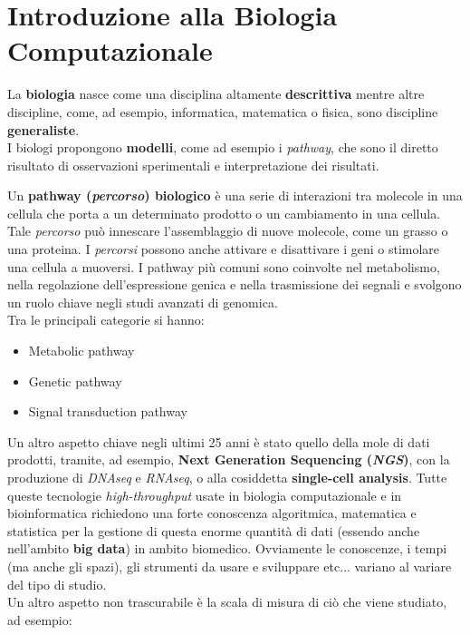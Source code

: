 \documentclass[a4paper,12pt, oneside]{book}
\begin{document}
\chapter{Introduzione alla Biologia Computazionale}
La \textbf{biologia} nasce come una disciplina altamente \textbf{descrittiva}
mentre altre discipline, come, ad esempio, informatica, matematica o fisica,
sono discipline \textbf{generaliste}.\\
I biologi propongono \textbf{modelli}, come ad esempio i \textit{pathway}, che
sono il diretto risultato di osservazioni sperimentali e interpretazione dei
risultati.
\begin{definizione}
  Un \textbf{pathway (\emph{percorso}) biologico} è una serie di interazioni
  tra molecole in una cellula che porta a un determinato prodotto o un
  cambiamento in una cellula. Tale \emph{percorso} può innescare
  l'assemblaggio di nuove molecole, come un grasso o una proteina. I
  \emph{percorsi} possono anche attivare e disattivare i geni o stimolare una
  cellula a muoversi. I pathway più comuni sono coinvolte nel metabolismo, nella
  regolazione dell'espressione genica e nella trasmissione dei segnali e
  svolgono un ruolo chiave negli studi avanzati di genomica.\\
  Tra le principali categorie si hanno:
  \begin{itemize}
    \item Metabolic pathway
    \item Genetic pathway
    \item Signal transduction pathway
  \end{itemize}
\end{definizione}
Un altro aspetto chiave negli ultimi 25 anni è stato quello della
mole di dati prodotti, tramite, ad esempio, \textbf{Next Generation Sequencing
  (\textit{NGS})}, con la produzione di \textit{DNAseq} e \textit{RNAseq}, o
alla cosiddetta \textbf{single-cell analysis}. Tutte queste tecnologie
\textit{high-throughput} usate in biologia computazionale e in bioinformatica
richiedono una forte conoscenza algoritmica, matematica e statistica per la
gestione di questa enorme quantità di dati (essendo anche nell'ambito
\textbf{big data}) in ambito biomedico. Ovviamente le conoscenze, i tempi (ma
anche gli spazi), gli strumenti da usare e sviluppare etc$\ldots$ variano al
variare del tipo di studio.\\ 
Un altro aspetto non trascurabile è la scala di misura di ciò che viene
studiato, ad esempio:
\end{document}
